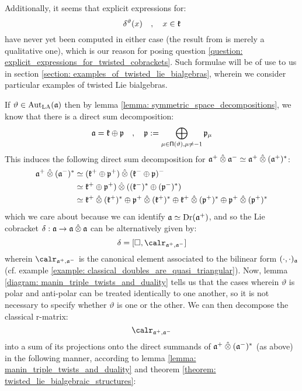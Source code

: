         Additionally, it seems that explicit expressions for:
            $$\delta^{\vartheta}(x) \quad, \quad x \in \mathfrak{k}$$
        have never yet been computed in either case (the result from \cite{schrader_integrable_systems_from_classical_reflection_equations} is merely a qualitative one), which is our reason for posing question \ref{question: explicit_expressions_for_twisted_cobrackets}. Such formulae will be of use to us in section \ref{section: examples_of_twisted_lie_bialgebras}, wherein we consider particular examples of twisted Lie bialgebras.

        If $\vartheta \in \operatorname{Aut}_{\mathrm{LA}}(\mathfrak{a})$ then by lemma \ref{lemma: symmetric_space_decompositions}, we know that there is a direct sum decomposition:
            $$\mathfrak{a} = \mathfrak{k} \oplus \mathfrak{p} \quad, \quad \mathfrak{p} := \bigoplus_{\mu \in \mathsf{\Pi}(\vartheta), \mu \not = -1} \mathfrak{p}_{\mu}$$
        This induces the following direct sum decomposition for $\a^+ \hattensor \a^- \cong \a^+ \hattensor (\a^+)^*$:
            $$
                \begin{aligned}
                    \a^+ \hattensor (\a^-)^* & \cong (\k^+ \oplus \p^+) \hattensor (\k^- \oplus \p)^-
                    \\
                    & \cong \k^+ \oplus \p^+) \hattensor ( (\k^-)^* \oplus (\p^-)^* )
                    \\
                    & \cong \k^+ \hattensor (\k^+)^* \oplus \p^+ \hattensor (\k^+)^* \oplus \k^+ \hattensor (\p^+)^* \oplus \p^+ \hattensor (\p^+)^*
                \end{aligned}
            $$
        which we care about because we can identify $\mathfrak{a} \simeq \operatorname{Dr}(\mathfrak{a}^+)$, and so the Lie cobracket $\delta: \a \to \a \hattensor \a$ can be alternatively given by:
            $$\delta = [\Box, \calr_{\a^+, \a^-}]$$
        wherein $\calr_{\a^+, \a^-}$ is the canonical element associated to the bilinear form $(\cdot, \cdot)_{\mathfrak{a}}$ (cf. example \ref{example: classical_doubles_are_quasi_triangular}). Now, lemma \ref{diagram: manin_triple_twists_and_duality} tells us that the cases wherein $\vartheta$ is polar and anti-polar can be treated identically to one another, so it is not necessary to specify whether $\vartheta$ is one or the other. We can then decompose the classical r-matrix:
            $$\calr_{\a^+, \a^-}$$
        into a sum of its projections onto the direct summands of $\a^+ \hattensor (\a^-)^*$ (as above) in the following manner, according to lemma \ref{lemma: manin_triple_twists_and_duality} and theorem \ref{theorem: twisted_lie_bialgebraic_structures}:
